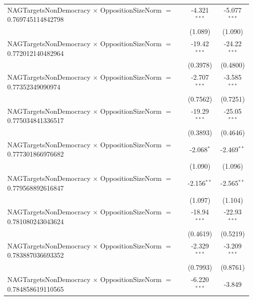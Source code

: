 \begin{tabular}{lcc}
   NAGTargetsNonDemocracy $\times$ OppositionSizeNorm $=$ 0.769745114842798     & -4.321$^{***}$       & -5.077$^{***}$\\   
                                                                                & (1.089)              & (1.090)\\   
   NAGTargetsNonDemocracy $\times$ OppositionSizeNorm $=$ 0.772012140482964     & -19.42$^{***}$       & -24.22$^{***}$\\   
                                                                                & (0.3978)             & (0.4800)\\   
   NAGTargetsNonDemocracy $\times$ OppositionSizeNorm $=$ 0.77352349090974      & -2.707$^{***}$       & -3.585$^{***}$\\   
                                                                                & (0.7562)             & (0.7251)\\   
   NAGTargetsNonDemocracy $\times$ OppositionSizeNorm $=$ 0.775034841336517     & -19.29$^{***}$       & -25.05$^{***}$\\   
                                                                                & (0.3893)             & (0.4646)\\   
   NAGTargetsNonDemocracy $\times$ OppositionSizeNorm $=$ 0.777301866976682     & -2.068$^{*}$         & -2.469$^{**}$\\   
                                                                                & (1.090)              & (1.096)\\   
   NAGTargetsNonDemocracy $\times$ OppositionSizeNorm $=$ 0.779568892616847     & -2.156$^{**}$        & -2.565$^{**}$\\   
                                                                                & (1.097)              & (1.104)\\   
   NAGTargetsNonDemocracy $\times$ OppositionSizeNorm $=$ 0.781080243043624     & -18.94$^{***}$       & -22.93$^{***}$\\   
                                                                                & (0.4619)             & (0.5219)\\   
   NAGTargetsNonDemocracy $\times$ OppositionSizeNorm $=$ 0.783887036693352     & -2.329$^{***}$       & -3.209$^{***}$\\   
                                                                                & (0.7993)             & (0.8761)\\   
   NAGTargetsNonDemocracy $\times$ OppositionSizeNorm $=$ 0.784858619110565     & -6.220$^{***}$       & -3.849\\   

\end{tabular}
